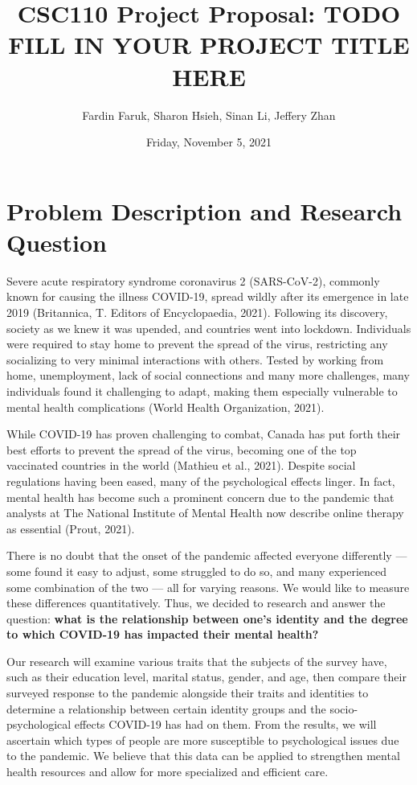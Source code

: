 \documentclass[fontsize=11pt]{article}
\title{CSC110 Project Proposal: TODO FILL IN YOUR PROJECT TITLE HERE}
\author{Fardin Faruk, Sharon Hsieh, Sinan Li, Jeffery Zhan}
\date{Friday, November 5, 2021}
\begin{document}
    \maketitle

    \section*{Problem Description and Research Question}

    Severe acute respiratory syndrome coronavirus 2 (SARS-CoV-2), commonly known for causing the illness COVID-19, spread wildly after its emergence in late 2019 (Britannica, T. Editors of Encyclopaedia, 2021). Following its discovery, society as we knew it was upended, and countries went into lockdown. Individuals were required to stay home to prevent the spread of the virus, restricting any socializing to very minimal interactions with others. Tested by working from home, unemployment, lack of social connections and many more challenges, many individuals found it challenging to adapt, making them especially vulnerable to mental health complications (World Health Organization, 2021).

    While COVID-19 has proven challenging to combat, Canada has put forth their best efforts to prevent the spread of the virus, becoming one of the top vaccinated countries in the world (Mathieu et al., 2021). Despite social regulations having been eased, many of the psychological effects linger. In fact, mental health has become such a prominent concern due to the pandemic that analysts at The National Institute of Mental Health now describe online therapy as essential (Prout, 2021).

    There is no doubt that the onset of the pandemic affected everyone differently — some found it easy to adjust, some struggled to do so, and many experienced some combination of the two — all for varying reasons. We would like to measure these differences quantitatively. Thus, we decided to research and answer the question: \textbf{what is the relationship between one’s identity and the degree to which COVID-19 has impacted their mental health?}

    Our research will examine various traits that the subjects of the survey have, such as their education level, marital status, gender, and age, then compare their surveyed response to the pandemic alongside their traits and identities to determine a relationship between certain identity groups and the socio-psychological effects COVID-19 has had on them. From the results, we will ascertain which types of people are more susceptible to psychological issues due to the pandemic. We believe that this data can be applied to strengthen mental health resources and allow for more specialized and efficient care.
\end{document}
